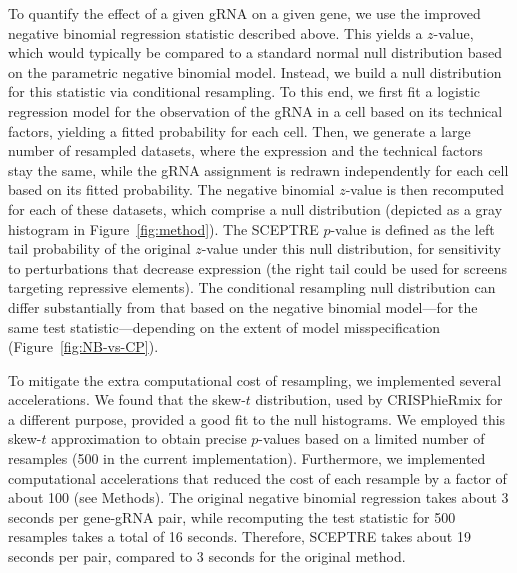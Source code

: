 \documentclass{nature}
\begin{document}
To quantify the effect of a given gRNA on a given gene, we use the improved negative binomial regression statistic described above. This yields a $z$-value, which would typically be compared to a standard normal null distribution based on the parametric negative binomial model. Instead, we build a null distribution for this statistic via conditional resampling. To this end, we first fit a logistic regression model for the observation of the gRNA in a cell based on its technical factors, yielding a fitted probability for each cell. Then, we generate a large number of resampled datasets, where the expression and the technical factors stay the same, while the gRNA assignment is redrawn independently for each cell based on its fitted probability. The negative binomial $z$-value is then recomputed for each of these datasets, which comprise a null distribution (depicted as a gray histogram in Figure~\ref{fig:method}). The SCEPTRE $p$-value is defined as the left tail probability of the original $z$-value under this null distribution, for sensitivity to perturbations that decrease expression (the right tail could be used for screens targeting repressive elements). The conditional resampling null distribution can differ substantially from that based on the negative binomial model---for the same test statistic---depending on the extent of model misspecification (Figure~\ref{fig:NB-vs-CP}).

To mitigate the extra computational cost of resampling, we implemented several accelerations. We found that the skew-$t$ distribution, used by CRISPhieRmix\cite{Daley2018} for a different purpose, provided a good fit to the null histograms. We employed this skew-$t$ approximation to obtain precise $p$-values based on a limited number of resamples (500 in the current implementation). Furthermore, we implemented computational accelerations that reduced the cost of each resample by a factor of about 100 (see Methods). The original negative binomial regression takes about 3 seconds per gene-gRNA pair, while recomputing the test statistic for 500 resamples takes a total of 16 seconds. Therefore, SCEPTRE takes about 19 seconds per pair, compared to 3 seconds for the original method.
\end{document}
